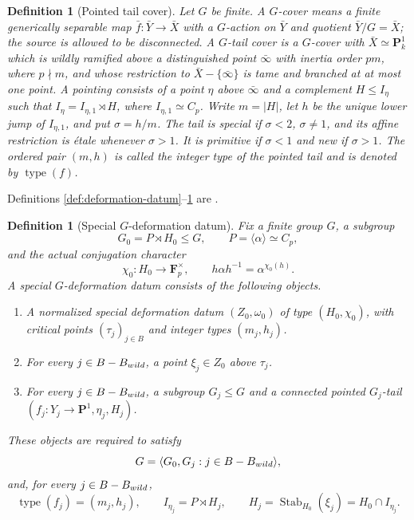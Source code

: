 \documentclass[10pt,a4paper]{amsart}
\newtheorem{definition}[theorem]{Definition}
\numberwithin{equation}{section}
\begin{document}
\begin{definition}[Pointed tail cover]\label{def:tail}
Let $G$ be finite.  A $G$-cover means a finite generically separable map
$\bar f:\bar Y\to\bar X$ with a $G$-action on $\bar Y$ and quotient
$\bar Y/G=\bar X$; the source is allowed to be disconnected.  A $G$-tail
cover is a $G$-cover with $\bar X\simeq\mathbf P^1_k$ which is wildly
ramified above a distinguished point
$\bar\infty$ with inertia order $pm$, where $p\nmid m$, and whose restriction to
$\bar X-\{\bar\infty\}$ is tame and branched at at most one point.  A
pointing consists of a point $\eta$ above $\bar\infty$ and a complement
$H\leq I_\eta$ such that
$I_\eta=I_{\eta,1}\rtimes H$, where $I_{\eta,1}\simeq C_p$.  Write
$m=|H|$, let $h$ be the unique lower
jump of $I_{\eta,1}$, and put $\sigma=h/m$.  The tail is special if
$\sigma<2$, $\sigma\ne1$, and its affine restriction is \'etale whenever
$\sigma>1$.  It is primitive if $\sigma<1$ and new if $\sigma>1$.
The ordered pair $(m,h)$ is called the integer type of the pointed tail and
is denoted by $\operatorname{type}(f)$.
\end{definition}

Definitions \ref{def:deformation-datum}--\ref{def:tail} are
\cite[Definitions~1.5, 2.7, 2.9, and 2.10]{WewersThree}.

\begin{definition}[Special $G$-deformation datum]
\label{def:special-G-datum}
Fix a finite group $G$, a subgroup
\[
 G_0=P\rtimes H_0\leq G,\qquad P=\langle\alpha\rangle\simeq C_p,
\]
and the actual conjugation character
\[
 \chi_0:H_0\longrightarrow\mathbf F_p^\times,
 \qquad h\alpha h^{-1}=\alpha^{\chi_0(h)}.
\]
A special $G$-deformation datum consists of the following objects.
\begin{enumerate}
\item A normalized special deformation datum $(Z_0,\omega_0)$ of type
$(H_0,\chi_0)$, with critical points $(\tau_j)_{j\in B}$ and integer types
$(m_j,h_j)$.
\item For every $j\in B-B_{\rm wild}$, a point $\xi_j\in Z_0$ above
$\tau_j$.
\item For every $j\in B-B_{\rm wild}$, a subgroup $G_j\leq G$ and a
connected pointed $G_j$-tail
$(f_j:Y_j\to\mathbf P^1,\eta_j,H_j)$.
\end{enumerate}
These objects are required to satisfy
\[
 G=\langle G_0,G_j:j\in B-B_{\rm wild}\rangle,
\]
and, for every $j\in B-B_{\rm wild}$,
\[
 \operatorname{type}(f_j)=(m_j,h_j),\qquad
 I_{\eta_j}=P\rtimes H_j,\qquad
 H_j=\operatorname{Stab}_{H_0}(\xi_j)
     =H_0\cap I_{\eta_j}.
\]
\end{definition}
\end{document}

